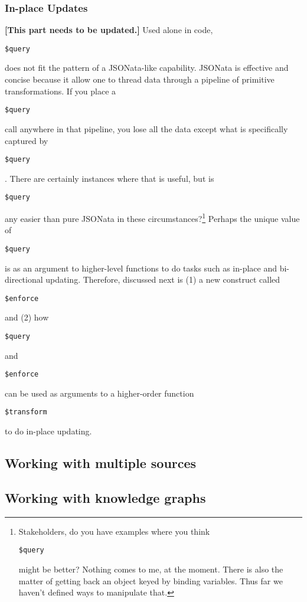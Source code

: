 \documentclass[9pt,letterpaper]{article}
\newcommand{\stt}[1]{\begin{footnotesize}\texttt{#1}\end{footnotesize}}
\begin{document}

\subsubsection{In-place Updates}

\textbf{[This part needs to be updated.]} Used alone in code, \stt{\$query} does not fit the pattern of a JSONata-like capability.
JSONata is effective and concise because it allow one to thread data through a pipeline of primitive transformations.
If you place a \stt{\$query} call anywhere in that pipeline, you lose all the data except what is specifically captured by \stt{\$query}.
There are certainly instances where that is useful, but is \stt{\$query} any easier than pure JSONata in these circumstances?\footnote{Stakeholders, do you have
  examples where you think \stt{\$query} might be better?
  Nothing comes to me, at the moment.
  There is also the matter of getting back an object keyed by binding variables.
  Thus far we haven't defined ways to manipulate that.}
Perhaps the unique value of \stt{\$query} is as an argument to higher-level functions to do tasks such as in-place and bi-directional updating.
Therefore, discussed next is (1) a new construct called \stt{\$enforce} and (2) how \stt{\$query} and \stt{\$enforce} can be used as arguments to a higher-order function \stt{\$transform} to do in-place updating.

\subsection{Working with multiple sources}

\subsection{Working with knowledge graphs}


\end{document}
